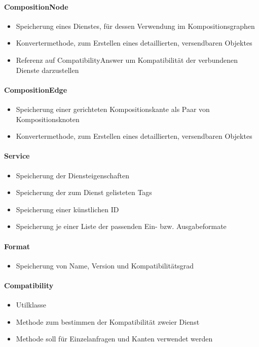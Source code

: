 \paragraph{CompositionNode}
\begin{itemize}
	\item Speicherung eines Dienstes, für dessen Verwendung im Kompositionsgraphen
	\item Konvertermethode, zum Erstellen eines detaillierten, versendbaren Objektes
	\item Referenz auf CompatibilityAnswer um Kompatibilität der verbundenen Dienste darzustellen
\end{itemize} 
\paragraph{CompositionEdge} 
\begin{itemize}
	\item Speicherung einer gerichteten Kompositionskante als Paar von Kompositionsknoten
	\item Konvertermethode, zum Erstellen eines detaillierten, versendbaren Objektes
\end{itemize}

\paragraph{Service}
\begin{itemize}
	\item Speicherung der Diensteigenschaften
	\item Speicherung der zum Dienst gelisteten Tags
	\item Speicherung einer künstlichen ID
	\item Speicherung je einer Liste der passenden Ein- bzw. Ausgabeformate
\end{itemize} 
\paragraph{Format}
\begin{itemize}
	\item Speicherung von Name, Version und Kompatibilitätsgrad
\end{itemize} 
\paragraph{Compatibility}
\begin{itemize}
	\item Utilklasse
	\item Methode zum bestimmen der Kompatibilität zweier Dienst
	\item Methode soll für Einzelanfragen und Kanten verwendet werden
\end{itemize} 




